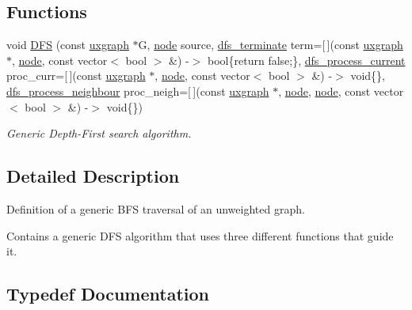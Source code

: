 \subsection*{Functions}
\begin{DoxyCompactItemize}
\item 
void \hyperlink{namespacelgraph_1_1traversal_1_1dfs_a50327c4c042329a05df9f2eb4d7f981a}{D\+FS} (const \hyperlink{classlgraph_1_1utils_1_1uxgraph}{uxgraph} $\ast$G, \hyperlink{namespacelgraph_1_1utils_a7bd66ede3805ef121bc2835bd48de0cf}{node} source, \hyperlink{namespacelgraph_1_1traversal_1_1dfs_a41b39b9a31fd3665c970a6eb70564765}{dfs\+\_\+terminate} term=\mbox{[}$\,$\mbox{]}(const \hyperlink{classlgraph_1_1utils_1_1uxgraph}{uxgraph} $\ast$, \hyperlink{namespacelgraph_1_1utils_a7bd66ede3805ef121bc2835bd48de0cf}{node}, const vector$<$ bool $>$ \&) -\/$>$ bool\{return false;\}, \hyperlink{namespacelgraph_1_1traversal_1_1dfs_a918161e9face694d4ebdc4ba13cdd5ac}{dfs\+\_\+process\+\_\+current} proc\+\_\+curr=\mbox{[}$\,$\mbox{]}(const \hyperlink{classlgraph_1_1utils_1_1uxgraph}{uxgraph} $\ast$, \hyperlink{namespacelgraph_1_1utils_a7bd66ede3805ef121bc2835bd48de0cf}{node}, const vector$<$ bool $>$ \&) -\/$>$ void\{\}, \hyperlink{namespacelgraph_1_1traversal_1_1dfs_af04d72933b75432a505b1235d173da4b}{dfs\+\_\+process\+\_\+neighbour} proc\+\_\+neigh=\mbox{[}$\,$\mbox{]}(const \hyperlink{classlgraph_1_1utils_1_1uxgraph}{uxgraph} $\ast$, \hyperlink{namespacelgraph_1_1utils_a7bd66ede3805ef121bc2835bd48de0cf}{node}, \hyperlink{namespacelgraph_1_1utils_a7bd66ede3805ef121bc2835bd48de0cf}{node}, const vector$<$ bool $>$ \&) -\/$>$ void\{\})
\begin{DoxyCompactList}\small\item\em Generic Depth-\/\+First search algorithm. \end{DoxyCompactList}\end{DoxyCompactItemize}


\subsection{Detailed Description}
Definition of a generic B\+FS traversal of an unweighted graph. 

Contains a generic D\+FS algorithm that uses three different functions that guide it. 

\subsection{Typedef Documentation}
